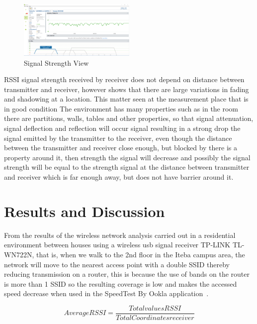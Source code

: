 \documentclass[conference]{IEEEtran}
\begin{document}
\begin{figure}[h]
    \centering
    \includegraphics[width=0.5\textwidth]{signal-strengh.png}
    \caption{ Signal Strength View  }
\end{figure}

RSSI signal strength received by
receiver does not depend on distance
between transmitter and receiver, however
shows that there are large variations in fading
and shadowing at a location. This matter
seen at the measurement place that is in good condition
The environment has many properties such as
in the room there are partitions, walls, tables and
other properties, so that signal attenuation, signal deflection and reflection will occur
signal resulting in a strong drop
the signal emitted by the transmitter to the
receiver, even though the distance between the transmitter and
receiver close enough, but blocked by
there is a property around it, then strength
the signal will decrease and possibly
the signal strength will be equal to the strength
signal at the distance between transmitter and receiver
which is far enough away, but does not have
barrier around it. 

\section{Results and Discussion}

From the results of the wireless network analysis carried out in a residential environment between houses using a wireless usb signal receiver TP-LINK TL-WN722N, that is, when we walk to the 2nd floor in the Iteba campus area, the network will move
to the nearest access point with a double SSID thereby reducing transmission on a router, this is because the use of bands on the router is more than 1 SSID so
the resulting coverage is low and makes the accessed speed decrease when used in the SpeedTest By Ookla application~\cite{Ookla}.

\begin{equation}
   Average RSSI = \frac{Total values RSSI}{Total Coordinates receiver}
    \label{rerata_rssi}
\end{equation}
\end{document}
